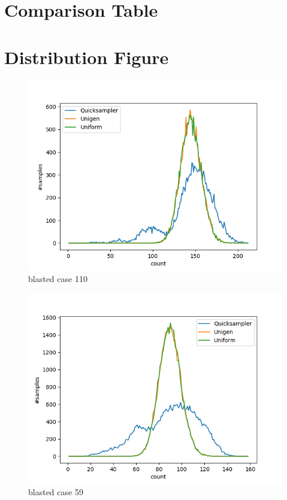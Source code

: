 \documentclass{article}
\begin{document}
\section{Comparison Table}

\hspace{-3cm}
\resizebox{18cm}{!}{

}

\section{Distribution Figure}
\begin{figure}[!h]
    \includegraphics[scale=0.7]{DistributionFigures/Figure_case_110.png}
    \caption{blasted case 110}
\end{figure}
\begin{figure}[!h]
    \includegraphics[scale=0.7]{DistributionFigures/Figure_case_59.png}
    \caption{blasted case 59}
\end{figure}
\end{document}
